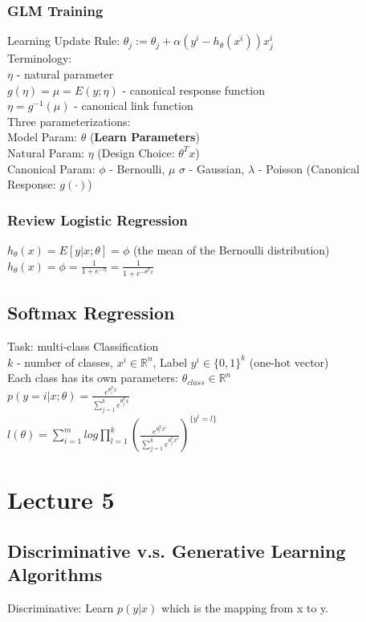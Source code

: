 \documentclass{article}
\begin{document}
\subsubsection{GLM Training}
Learning Update Rule:
  $\theta_j := \theta_j + \alpha(y^i-h_\theta(x^i))x_j^i$\\

\noindent
Terminology:\\
$\eta$ - natural parameter\\
$g(\eta) = \mu = E(y;\eta)$ - canonical response function\\
$\eta = g^{-1}(\mu)$ - canonical link function\\

\noindent
Three parameterizations:\\
Model Param: $\theta$ (\textbf{Learn Parameters})\\
Natural Param: $\eta$ (Design Choice: $\theta^Tx$)\\
Canonical Param: $\phi$ - Bernoulli, $\mu$ $\sigma$ - Gaussian, $\lambda$ - Poisson (Canonical Response: $g(\cdot)$)

\subsubsection{Review Logistic Regression}
$h_\theta(x) = E[y|x;\theta] = \phi$ (the mean of the Bernoulli distribution)\\
$h_\theta(x) = \phi = \frac{1}{1+e^{-\eta}} = \frac{1}{1+e^{-\theta^Tx}}$

\subsection{Softmax Regression}
Task: multi-class Classification\\
$k$ - number of classes, $x^i \in \mathbb{R}^n$, Label $y^i \in \{0,1\}^k$ (one-hot vector)\\
Each class has its own parameters: $\theta_{class} \in \mathbb{R}^n$\\
$p(y=i|x;\theta) = \frac{e^{\theta_i^Tx}}{\sum_{j=1}^ke^{\theta_j^Tx}}$\\
$l(\theta) = \sum\limits_{i=1}^mlog\prod\limits_{l=1}^k(\frac{e^{\theta_l^Tx^i}}{\sum_{j=1}^ke^{\theta_j^Tx^i}})^{\{y^i = l\}}$


\section{Lecture 5}
\subsection{Discriminative v.s. Generative Learning Algorithms}
Discriminative: Learn $p(y|x)$ which is the mapping from x to y.\\
\end{document}
